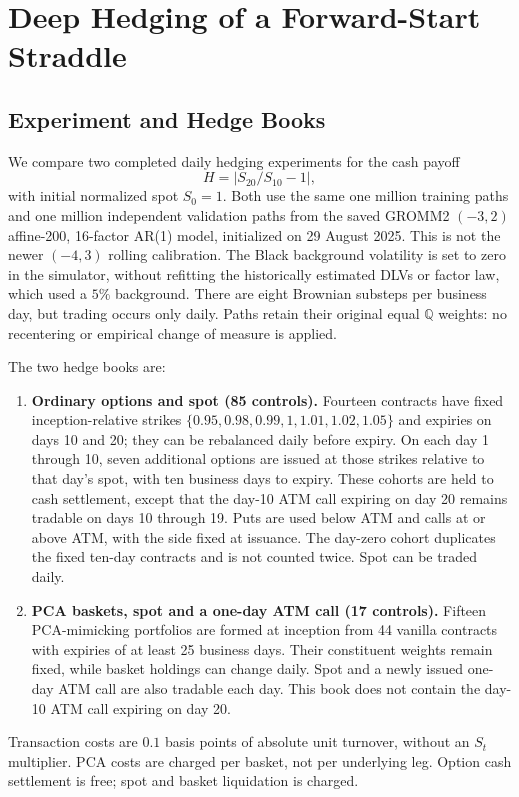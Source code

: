 \documentclass[11pt]{article}
\newcommand{\Q}{\mathbb Q}
\newcommand{\abs}[1]{\lvert #1\rvert}
\theoremstyle{plain}
\theoremstyle{definition}
\theoremstyle{remark}
\begin{document}
\section{Deep Hedging of a Forward-Start Straddle}
\label{sec:deep-hedging-forward-start}

\subsection{Experiment and Hedge Books}
\label{sec:deep-hedging-setup}

We compare two completed daily hedging experiments for the cash payoff
\begin{equation}
  H=\abs{S_{20}/S_{10}-1},
  \label{eq:forward-start-hedging-payoff}
\end{equation}
with initial normalized spot $S_0=1$.  Both use the same one million
training paths and one million independent validation paths from the saved
GROMM2 $(-3,2)$ affine-200, 16-factor AR(1) model, initialized on
29 August 2025.  This is not the newer $(-4,3)$ rolling calibration.
The Black background volatility is set to zero in the simulator, without
refitting the historically estimated DLVs or factor law, which used a
$5\%$ background.  There are eight Brownian substeps per business day,
but trading occurs only daily.  Paths retain their original equal
$\Q$ weights: no recentering or empirical change of measure is applied.

The two hedge books are:
\begin{enumerate}[leftmargin=*]
  \item \textbf{Ordinary options and spot (85 controls).}
  Fourteen contracts have fixed inception-relative strikes
  $\{0.95,0.98,0.99,1,1.01,1.02,1.05\}$ and expiries on days 10 and 20;
  they can be rebalanced daily before expiry.  On each day 1 through 10,
  seven additional options are issued at those strikes relative to that
  day's spot, with ten business days to expiry.  These cohorts are held
  to cash settlement, except that the day-10 ATM call expiring on day 20
  remains tradable on days 10 through 19.  Puts are used below ATM and
  calls at or above ATM, with the side fixed at issuance.  The day-zero
  cohort duplicates the fixed ten-day contracts and is not counted twice.
  Spot can be traded daily.
  \item \textbf{PCA baskets, spot and a one-day ATM call (17 controls).}
  Fifteen PCA-mimicking portfolios are formed at inception from 44 vanilla
  contracts with expiries of at least 25 business days.  Their constituent
  weights remain fixed, while basket holdings can change daily.  Spot and
  a newly issued one-day ATM call are also tradable each day.  This book
  does not contain the day-10 ATM call expiring on day 20.
\end{enumerate}
Transaction costs are $0.1$ basis points of absolute unit turnover, without
an $S_t$ multiplier.  PCA costs are charged per basket, not per underlying
leg.  Option cash settlement is free; spot and basket liquidation is charged.
\end{document}
